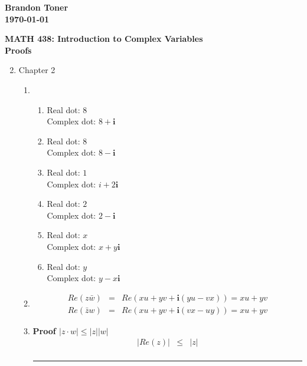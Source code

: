 \documentclass{article}%
\newcommand\abs[1]{\left|#1\right|}
\newcommand\I{\textbf{i}}
\newenvironment{proof}[1][]{\begin{samepage}\textbf{Proof #1} }{\rule{0.5em}{0.5em} \end{samepage}}
\begin{document}
\begin{flushright}
\textbf{Brandon Toner \\
\today}
\end{flushright}

\begin{center}
\textbf{MATH 438: Introduction to Complex Variables \\
Proofs} \\
\end{center}

\begin{enumerate}
    \setcounter{enumi}{1}
    \item Chapter 2
    \begin{enumerate}[label*=\arabic*.]
        \item %
        \begin{enumerate}[label=\alph*.]
            \item %
                Real dot: $8$ \\
                Complex dot: $8+\I$
            \item %
                Real dot: $8$ \\
                Complex dot: $8-\I$
             \item %
                Real dot: $1$ \\
                Complex dot: $i+2\I$
            \item %
                Real dot: $2$ \\
                Complex dot: $2-\I$
            \item %
                Real dot: $x$ \\
                Complex dot: $x+y\I$
            \item %
                Real dot: $y$ \\
                Complex dot: $y-x\I$
        \end{enumerate}
        \item %
        \begin{eqnarray*}
            Re(z\bar{w})&=&Re(xu+yv+\I(yu-vx))=xu+yv \\
            Re(\bar{z}w)&=&Re(xu+yv+\I(vx-uy))=xu+yv
        \end{eqnarray*}
        \item %
        \begin{proof}[$\abs{z \cdot w} \leq \abs{z}\abs{w}$]
            \begin{eqnarray*}
                \abs{Re(z)} &\leq& \abs{z} \\

\end{eqnarray*}
\end{proof}
\end{enumerate}
\end{enumerate}
\end{document}
